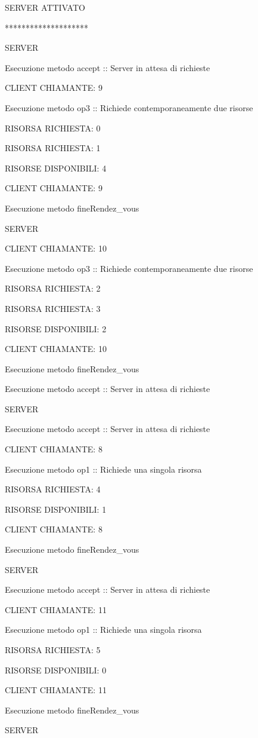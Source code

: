\documentclass[10pt, a4paper]{article}
\begin{document}
SERVER ATTIVATO

********************

SERVER

Esecuzione metodo accept :: Server in attesa di richieste

CLIENT CHIAMANTE: 9

Esecuzione metodo op3 :: Richiede contemporaneamente due risorse

RISORSA RICHIESTA: 0

RISORSA RICHIESTA: 1

RISORSE DISPONIBILI: 4

CLIENT CHIAMANTE: 9

Esecuzione metodo fineRendez\_vous

SERVER

CLIENT CHIAMANTE: 10

Esecuzione metodo op3 :: Richiede contemporaneamente due risorse

RISORSA RICHIESTA: 2

RISORSA RICHIESTA: 3

RISORSE DISPONIBILI: 2

CLIENT CHIAMANTE: 10

Esecuzione metodo fineRendez\_vous

Esecuzione metodo accept :: Server in attesa di richieste

SERVER

Esecuzione metodo accept :: Server in attesa di richieste

CLIENT CHIAMANTE: 8

Esecuzione metodo op1 :: Richiede una singola risorsa

RISORSA RICHIESTA: 4

RISORSE DISPONIBILI: 1

CLIENT CHIAMANTE: 8

Esecuzione metodo fineRendez\_vous

SERVER

Esecuzione metodo accept :: Server in attesa di richieste

CLIENT CHIAMANTE: 11

Esecuzione metodo op1 :: Richiede una singola risorsa

RISORSA RICHIESTA: 5

RISORSE DISPONIBILI: 0

CLIENT CHIAMANTE: 11

Esecuzione metodo fineRendez\_vous

SERVER
\end{document}
